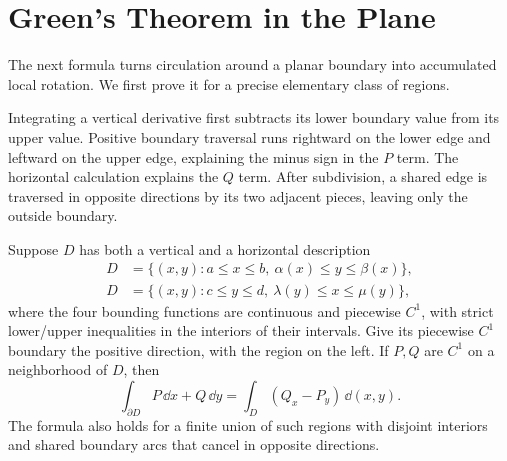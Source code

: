 \section{Green's Theorem in the Plane}
The next formula turns circulation around a planar boundary into accumulated
local rotation. We first prove it for a precise elementary class of regions.


Integrating a vertical derivative first subtracts its lower boundary value
from its upper value. Positive boundary traversal runs rightward on the
lower edge and leftward on the upper edge, explaining the minus sign in
the $P$ term. The horizontal calculation explains the $Q$ term. After
subdivision, a shared edge is traversed in opposite directions by its two
adjacent pieces, leaving only the outside boundary.
\begin{theorem}
\label{thm:green-elementary}
Suppose $D$ has both a vertical and a horizontal description
\[
\begin{split}
D&=\{(x,y):a\leq x\leq b,\ \alpha(x)\leq y\leq\beta(x)\},\\
D&=\{(x,y):c\leq y\leq d,\ \lambda(y)\leq x\leq\mu(y)\},
\end{split}
\]
where the four bounding functions are continuous and piecewise $C^1$,
with strict lower/upper inequalities in the interiors of their intervals.
Give its piecewise $C^1$ boundary the positive direction, with the region
on the left. If $P,Q$ are $C^1$ on a neighborhood of $D$, then
\[
\int_{\partial D}P\,\dd x+Q\,\dd y
=\int_D(Q_x-P_y)\,\dd(x,y).
\]
The formula also holds for a finite union of such regions with disjoint
interiors and shared boundary arcs that cancel in opposite directions.
\end{theorem}
\begin{center}
\end{center}
